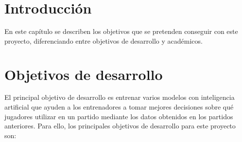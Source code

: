 
\section{Introducción}
En este capítulo se describen los objetivos que se pretenden conseguir con este proyecto, diferenciando entre objetivos de desarrollo y académicos.








\section{Objetivos de desarrollo}

\label{sec:desarrollo}
El principal objetivo de desarrollo es entrenar varios modelos con inteligencia artificial que ayuden a los entrenadores a tomar mejores decisiones sobre qué jugadores utilizar en un partido mediante los datos obtenidos en los partidos anteriores. Para ello, los principales objetivos de desarrollo para este proyecto son:
